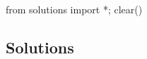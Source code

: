 \begin{python0}
from solutions import *; clear() 
\end{python0}




\newpage

\newpage
\subsection*{Solutions}
